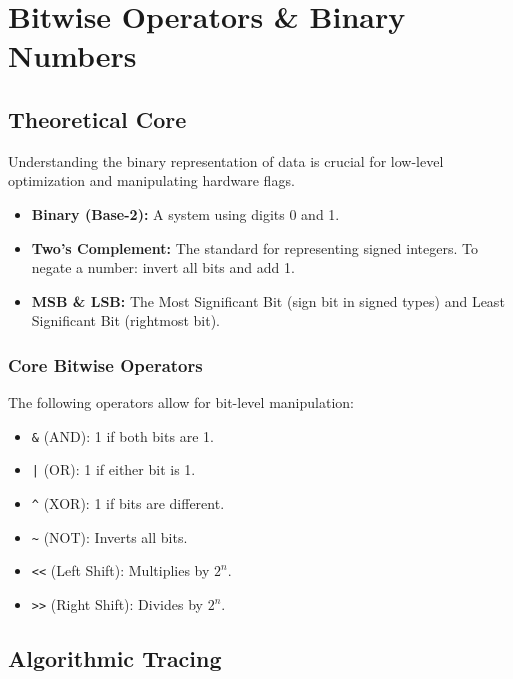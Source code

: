 \chapter{Bitwise Operators \& Binary Numbers}

\section{Theoretical Core}

Understanding the binary representation of data is crucial for low-level optimization and manipulating hardware flags.

\begin{definition}
    \begin{itemize}
        \item \textbf{Binary (Base-2):} A system using digits 0 and 1.
        \item \textbf{Two's Complement:} The standard for representing signed integers. To negate a number: invert all bits and add 1.
        \item \textbf{MSB \& LSB:} The Most Significant Bit (sign bit in signed types) and Least Significant Bit (rightmost bit).
    \end{itemize}
\end{definition}

\subsection{Core Bitwise Operators}

\begin{theorem}
    The following operators allow for bit-level manipulation:
    \begin{itemize}
        \item \texttt{\&} (AND): 1 if both bits are 1.
        \item \texttt{|} (OR): 1 if either bit is 1.
        \item \texttt{\^} (XOR): 1 if bits are different.
        \item \texttt{\textasciitilde} (NOT): Inverts all bits.
        \item \texttt{<<} (Left Shift): Multiplies by $2^n$.
        \item \texttt{>>} (Right Shift): Divides by $2^n$.
    \end{itemize}
\end{theorem}

\section{Algorithmic Tracing}


